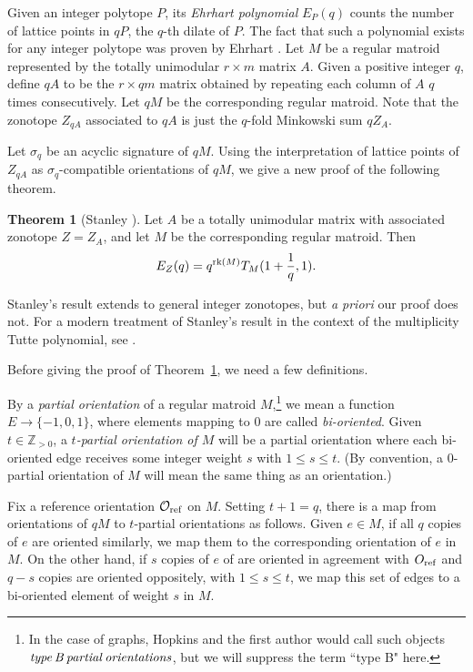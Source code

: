 \documentclass[12pt]{amsart}
\numberwithin{equation}{section}
\theoremstyle{definition}
\newtheorem{theorem}{Theorem}[subsection]
\begin{document}
Given an integer polytope $P$, its {\it Ehrhart polynomial} $E_P(q)$ counts the number of lattice points in  $qP$, the $q$-th dilate of $P$.  The fact that such a polynomial exists for any integer polytope was proven by Ehrhart \cite{ehrhart1962polynomial}.  Let $M$ be a regular matroid represented by the totally unimodular $r \times m$ matrix $A$.
Given a positive integer $q$, define $qA$ to be the $r \times qm$ matrix obtained by repeating each column of $A$ $q$ times consecutively.
Let $qM$ be the corresponding regular matroid.  
Note that the zonotope $Z_{qA}$ associated to $qA$ is just the $q$-fold Minkowski sum $qZ_A$.

\medskip

Let $\sigma_q$ be an acyclic signature of $qM$. Using the interpretation of lattice points of $Z_{qA}$ as $\sigma_q$-compatible orientations of $qM$, we give a new proof of the following theorem.
 
\begin{theorem}[Stanley \cite{stanley1991ehrhart}]\label{Ehrhart}
Let $A$ be a totally unimodular matrix with associated zonotope $Z=Z_A$, and let $M$ be the corresponding regular matroid.  
Then
\[
E_Z(q) = q^{{\rm rk}(M)} T_{M}(1 + \frac{1}{q},1).
\]
\end{theorem}


 Stanley's result extends to general integer zonotopes, but {\it a priori} our proof does not.  For a modern treatment of Stanley's result in the context of the multiplicity Tutte polynomial, see \cite{moci2012arithmetic}.

Before giving the proof of Theorem~\ref{Ehrhart}, we need a few definitions.  

By a {\em partial orientation} of a regular matroid $M$,\footnote{In the case of graphs, Hopkins and the first author would call such objects ${\it type\, B \, partial\,  orientations}$, but we will suppress the term ``type B" here.} we mean a function $E \to \{-1, 0, 1\}$, where elements mapping to $0$ are called {\em bi-oriented}.    Given $t \in \mathbb{Z}_{>0}$, a {\em $t$-partial orientation of $M$} will be a partial orientation where each bi-oriented edge receives some integer weight $s$ with  $1 \leq s \leq t$. (By convention,  a $0$-partial orientation of $M$ will mean the same thing as an orientation.)  

Fix a reference orientation $\mathcal{O}_{\rm ref}$ on $M$.
Setting $t+1=q$, there is a map from orientations of $qM$ to $t$-partial orientations as follows.  
Given $e \in M$, if all $q$ copies of $e$ are oriented similarly, we map them to the corresponding orientation of $e$ in $M$.  On the other hand, if $s$ copies of $e$ of are oriented in agreement with $O_{\rm ref}$ and $q-s$ copies are oriented oppositely, with $1 \leq s \leq t$, we map this set of edges to a bi-oriented element of weight $s$ in $M$. 
\end{document}
